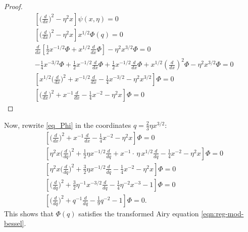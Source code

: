 \documentclass{article}
\theoremstyle{definition}
\theoremstyle{plain}
\begin{document}
\begin{proof}
\begin{align*}
&\left[\big(\tfrac{d}{dx}\big)^2 - \eta^2 x \right] \psi(x, \eta) = 0\\
&\left[\big(\tfrac{d}{dx}\big)^2 - \eta^2 x \right] x^{1/2}\Phi(q) = 0\\
&\frac{d}{dx}\left[\tfrac{1}{2}x^{-1/2}\Phi+x^{1/2}\tfrac{d}{dx}\Phi\right]-\eta^2x^{3/2}\Phi=0\\
&-\tfrac{1}{4}x^{-3/2}\Phi+\tfrac{1}{2}x^{-1/2}\tfrac{d}{dx}\Phi+\tfrac{1}{2}x^{-1/2}\tfrac{d}{dx}\Phi+x^{1/2}\left(\tfrac{d}{dx}\right)^2\Phi-\eta^2x^{3/2}\Phi=0\\
&\left[x^{1/2}\big(\tfrac{d}{dx}\big)^2+x^{-1/2}\tfrac{d}{dx}-\tfrac{1}{4}x^{-3/2}-\eta^2x^{3/2}\right]\Phi=0\\
&\left[\big(\tfrac{d}{dx}\big)^2+x^{-1}\tfrac{d}{dx}-\tfrac{1}{4}x^{-2}-\eta^2x\right]\Phi=0
\end{align*}
\end{proof}
Now, rewrite \eqref{eq_Phi} in the coordinates $q=\frac{2}{3}\eta x^{3/2}$: 
\begin{align*}
&\left[\big(\tfrac{d}{dx}\big)^2+x^{-1}\tfrac{d}{dx}-\tfrac{1}{4}x^{-2}-\eta^2x\right]\Phi=0\\
&\left[\eta^2x\big(\tfrac{d}{dq}\big)^2+\frac{1}{2}\eta x^{-1/2}\tfrac{d}{dq}+x^{-1}\cdot\, \eta\,  x^{1/2}\tfrac{d}{dq}-\tfrac{1}{4}x^{-2}-\eta^2x\right]\Phi=0\\
&\left[\eta^2x\big(\tfrac{d}{dq}\big)^2+\tfrac{3}{2}\eta x^{-1/2}\tfrac{d}{dq}-\tfrac{1}{4}x^{-2}-\eta^2x\right]\Phi=0\\
&\left[\big(\tfrac{d}{dq}\big)^2+\tfrac{3}{2}\eta^{-1} x^{-3/2}\tfrac{d}{dq}-\tfrac{1}{4}\eta^{-2}x^{-3}-1\right]\Phi=0\\
&\left[\big(\tfrac{d}{dq}\big)^2+q^{-1}\tfrac{d}{dq}-\tfrac{1}{9}q^{-2}-1\right]\Phi=0.
\end{align*}
This shows that $\Phi(q)$ satisfies the transformed Airy equation \eqref{eqn:reg-mod-bessel}. 
\end{document}
